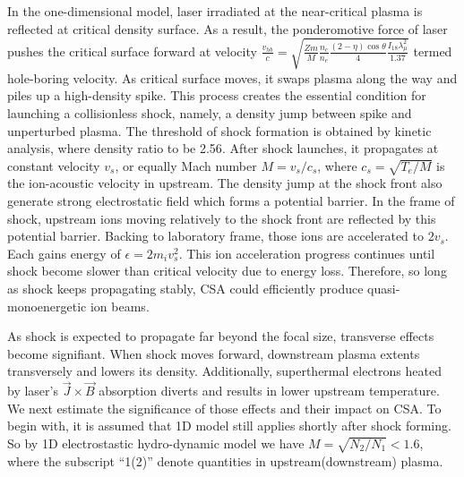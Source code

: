 \documentclass[12pt]{iopart}
\begin{document}
In the one-dimensional model, laser irradiated at the near-critical plasma is reflected at critical density surface. As a result, the ponderomotive force of laser pushes the critical surface forward at velocity $\frac{v_{hb}}{c}=\sqrt{\frac{Z m}{M}\frac{n_c}{n_e}\frac{(2-\eta)\cos\theta}{4}\frac{I_{18} \lambda_{\mu}^2}{1.37}}$ termed hole-boring velocity\cite{gibbon_short_2005}. As critical surface moves, it swaps plasma along the way and piles up a high-density spike. This process creates the essential condition for launching a collisionless shock, namely, a density jump between spike and unperturbed plasma. The threshold of shock formation is obtained by kinetic analysis\cite{fiuza_laser-driven_2012}, where density ratio to be 2.56\cite{zhang_quasi-monoenergetic_2016}. After shock launches, it propagates at constant velocity $v_{s}$, or equally Mach number $M=v_s/c_s$, where $c_s=\sqrt{T_e/M}$ is the ion-acoustic velocity in upstream\cite{tidman_shock_1971}. The density jump at the shock front also generate strong electrostatic field which forms a potential barrier. In the frame of shock, upstream ions moving relatively to the shock front are reflected by this potential barrier. Backing to laboratory frame, those ions are accelerated to $2v_s$. Each gains energy of $\epsilon=2m_i v_s^2$.  This ion acceleration progress continues until shock become slower than critical velocity due to energy loss. Therefore, so long as shock keeps propagating stably, CSA could efficiently produce quasi-monoenergetic ion beams.

As shock is expected to propagate far beyond the focal size, transverse effects become signifiant. When shock moves forward, downstream plasma extents transversely and lowers its density. Additionally, superthermal electrons heated by laser's $\vec{J}\times \vec{B} $ absorption\cite{gibbon_short_2005} diverts and results in lower upstream temperature. We next estimate the significance of those effects and their impact on CSA. To begin with, it is assumed that 1D model still applies shortly after shock forming. So by 1D electrostastic hydro-dynamic model\cite{tidman_shock_1971,zhang_quasi-monoenergetic_2016} we have $M=\sqrt{N_2 / N_1}<1.6$, where the subscript ``1(2)'' denote quantities in upstream(downstream) plasma. 
\end{document}
